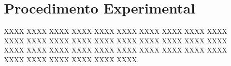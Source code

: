 \chapter{Procedimento Experimental} \label{chap:resultados}
XXXX XXXX XXXX XXXX XXXX XXXX XXXX XXXX XXXX XXXX XXXX XXXX XXXX XXXX XXXX XXXX XXXX XXXX XXXX XXXX XXXX XXXX XXXX XXXX XXXX XXXX XXXX XXXX XXXX XXXX XXXX XXXX XXXX XXXX XXXX XXXX.